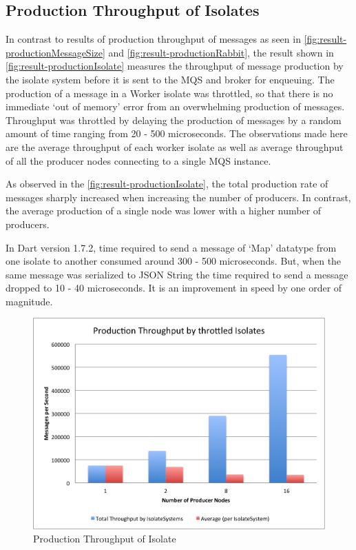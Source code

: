 \subsection{Production Throughput of Isolates}
  In contrast to results of production throughput of messages as seen in \autoref{fig:result-productionMessageSize} and \autoref{fig:result-productionRabbit}, the result shown in
 \autoref{fig:result-productionIsolate} measures the throughput of message production by the isolate system before it is sent to the MQS and broker for enqueuing. The production of a message in a Worker isolate was throttled, so that there is no immediate ‘out of memory’ error from an overwhelming production of messages. Throughput was throttled by delaying the production of messages by a random amount of time ranging from 20 - 500 microseconds. The observations made here are the average throughput of each worker isolate as well as average throughput of all the producer nodes connecting to a single MQS instance.

  As observed in the \autoref{fig:result-productionIsolate}, the total production rate of messages sharply increased when increasing the number of producers. In contrast, the average production of a single node was lower with a higher number of producers.

  In Dart version 1.7.2, time required to send a message of ‘Map’ datatype from one isolate to another consumed around 300 - 500 microseconds. But, when the same message was serialized to JSON String the time required to send a message dropped to 10 - 40 microseconds. It is an improvement in speed by one order of magnitude.

\begin{figure}[H]
  \centering  \includegraphics[width=1\textwidth]{figures/06productionIsolate}
  \caption[Production Throughput of Isolate]{Production Throughput of Isolate}
  \label{fig:result-productionIsolate}
\end{figure}

